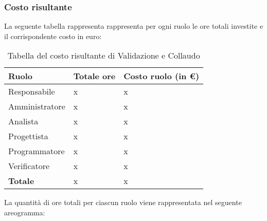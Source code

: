 \subsubsection{Costo risultante}
La seguente tabella rappresenta rappresenta per ogni ruolo le ore totali investite e il corrispondente costo in euro:
{
\renewcommand{\arraystretch}{2}
\begin{longtable}{ C{3cm} C{2cm} C{4cm}}
\caption{Tabella del costo risultante di Validazione e Collaudo}\\
\rowcolor{\primaryColor}

\textcolor{\secondaryColor}{\textbf{Ruolo}} & 
\textcolor{\secondaryColor}{\textbf{Totale ore}} & 
\textcolor{\secondaryColor}{\textbf{Costo ruolo (in \euro{})}}\\	
\endhead
        
Responsabile    &  x & x \\
Amministratore  &  x & x \\
Analista        &  x & x \\
Progettista     &  x & x \\
Programmatore   &  x & x \\
Verificatore    &  x & x \\
\textbf{Totale} & x & x \\
	
\end{longtable}
}

\vskip 30pt %
La quantità di ore totali per ciascun ruolo viene rappresentata nel seguente areogramma:
\begin{center}
\end{center}
